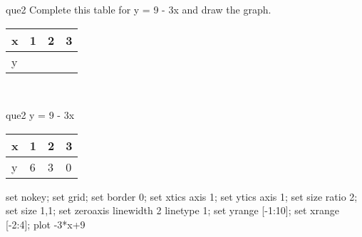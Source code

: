 \documentclass[13.5pt, varwidth=true]{beamer}
\begin{document}
\begin{frame}[shrink=19,fragile]
	\begin{beamercolorbox}[rounded=true, left, shadow=true,wd=14.8cm]{que2}
		 Complete this table for y = 9 - 3x and draw the graph. \\[0.3cm] \renewcommand{\arraystretch}{1.2}\begin{tabular}{|C|C|C|C|} \hline x & 1 & 2 & 3 \\ \hline y & & & \\ \hline \end{tabular}\\[0.3cm]
	\end{beamercolorbox}
\end{frame}
\begin{frame}[shrink=19,fragile]
	\begin{beamercolorbox}[rounded=true, left, shadow=true,wd=14.8cm]{que2}
		y = 9 - 3x\renewcommand{\arraystretch}{1.2}\begin{tabular}{|C|C|C|C|} \hline x & 1 & 2 & 3 \\ \hline y & 6 & 3 & 0\\ \hline \end{tabular}\begin{gnuplot}[terminal=pdf] set nokey; set grid; set border 0; set xtics axis 1; set ytics axis 1; set size ratio 2; set size 1,1; set zeroaxis linewidth 2 linetype 1; set yrange [-1:10]; set xrange [-2:4]; plot -3*x+9 \end{gnuplot}
	\end{beamercolorbox}
\end{frame}
\end{document}
